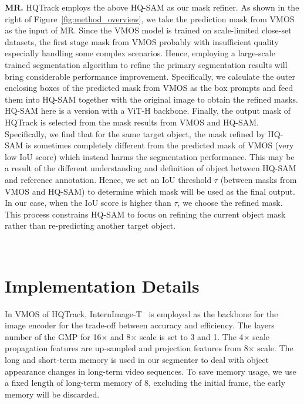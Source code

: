 \documentclass[10pt,twocolumn,letterpaper]{article}
\begin{document}
\noindent\textbf{MR.} HQTrack employs the above HQ-SAM as our mask refiner.
As shown in the right of Figure~\ref{fig:method_overview}, we take the prediction mask from VMOS as the input of MR.
Since the VMOS model is trained on scale-limited close-set datasets, the first stage mask from VMOS probably with insufficient quality especially handling some complex scenarios.
Hence, employing a large-scale trained segmentation algorithm to refine the primary segmentation results will bring considerable performance improvement.
Specifically, we calculate the outer enclosing boxes of the predicted mask from VMOS as the box prompts and feed them into HQ-SAM together with the original image to obtain the refined masks. HQ-SAM here is a version with a ViT-H backbone.
Finally, the output mask of HQTrack is selected from the mask results from VMOS and HQ-SAM. 
Specifically, we find that for the same target object, the mask refined by HQ-SAM is sometimes completely different from the predicted mask of VMOS (very low IoU score) which instead harms the segmentation performance. This may be a result of the different understanding and definition of object between HQ-SAM and reference annotation. Hence, we set an IoU threshold $\tau$ (between masks from VMOS and HQ-SAM) to determine which mask will be used as the final output. In our case, when the IoU score is higher than $\tau$, we choose the refined mask. This process constrains HQ-SAM to focus on refining the current object mask rather than re-predicting another target object.


 \


\section{Implementation Details}


In VMOS of HQTrack, InternImage-T~\cite{internimage} is employed as the backbone for the image encoder for the trade-off between accuracy and efficiency.
The layers number of the GMP for 16$\times$ and 8$\times$ scale is set to 3 and 1. The 4$\times$ scale propagation features are up-sampled and projection features from 8$\times$ scale.
The long and short-term memory is used in our segmenter to deal with object appearance changes in long-term video sequences.
To save memory usage, we use a fixed length of long-term memory of 8, excluding the initial frame, the early memory will be discarded. 
\end{document}
